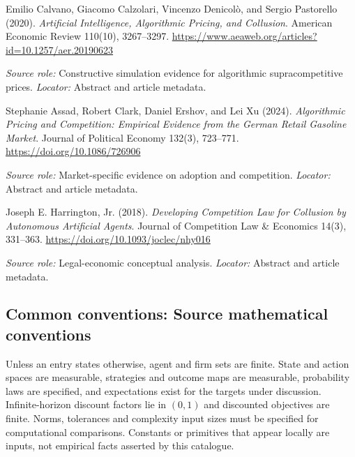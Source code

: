 \documentclass[11pt,a4paper]{article}
\begin{document}
\begin{enumerate}[label={[S\arabic*]},leftmargin=*]

\item Emilio Calvano, Giacomo Calzolari, Vincenzo Denicolò, and Sergio Pastorello (2020). \emph{Artificial Intelligence, Algorithmic Pricing, and Collusion}. American Economic Review 110(10), 3267--3297. \url{https://www.aeaweb.org/articles?id=10.1257/aer.20190623}\par \textit{Source role:} Constructive simulation evidence for algorithmic supracompetitive prices. \textit{Locator:} Abstract and article metadata.

\item Stephanie Assad, Robert Clark, Daniel Ershov, and Lei Xu (2024). \emph{Algorithmic Pricing and Competition: Empirical Evidence from the German Retail Gasoline Market}. Journal of Political Economy 132(3), 723--771. \url{https://doi.org/10.1086/726906}\par \textit{Source role:} Market-specific evidence on adoption and competition. \textit{Locator:} Abstract and article metadata.

\item Joseph E. Harrington, Jr. (2018). \emph{Developing Competition Law for Collusion by Autonomous Artificial Agents}. Journal of Competition Law \& Economics 14(3), 331--363. \url{https://doi.org/10.1093/joclec/nhy016}\par \textit{Source role:} Legal-economic conceptual analysis. \textit{Locator:} Abstract and article metadata.

\end{enumerate}

\subsection*{Common conventions: Source mathematical conventions}

Unless an entry states otherwise, agent and firm sets are finite. State and action spaces are measurable, strategies and outcome maps are measurable, probability laws are specified, and expectations exist for the targets under discussion. Infinite-horizon discount factors lie in $(0,1)$ and discounted objectives are finite. Norms, tolerances and complexity input sizes must be specified for computational comparisons. Constants or primitives that appear locally are inputs, not empirical facts asserted by this catalogue.
\end{document}
